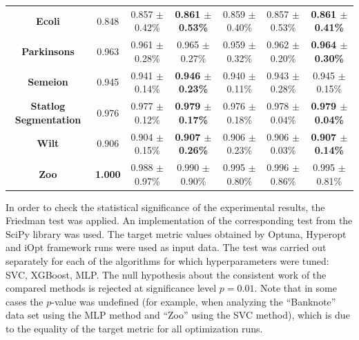 \documentclass[iicol]{sn-jnl}
\theoremstyle{thmstyleone}%
\theoremstyle{thmstyletwo}%
\theoremstyle{thmstylethree}%
\begin{document}
\begin{table}
{\begin{tabular}{ccccccc}
\textbf{Ecoli}                  & 0.848                                 & 0.857 $\pm$ 0.42\%                                 & \textbf{0.861 $\pm$ 0.53\%}                        & 0.859 $\pm$ 0.40\%                                 & 0.857 $\pm$ 0.53\%                                 & {\color[HTML]{FE0000} \textbf{0.861 $\pm$ 0.41\%}} \\
\textbf{Parkinsons}             & {\color[HTML]{FE0000} 0.963}          & 0.961 $\pm$ 0.28\%                                 & 0.965 $\pm$ 0.27\%                                 & 0.959 $\pm$ 0.32\%                                 & 0.962 $\pm$ 0.20\%                                 & \textbf{0.964 $\pm$ 0.30\%}                        \\
\textbf{Semeion}                & {\color[HTML]{FE0000} 0.945}          & 0.941 $\pm$ 0.14\%                                 & \textbf{0.946 $\pm$ 0.23\%}                        & 0.940 $\pm$ 0.11\%                                 & 0.943 $\pm$ 0.28\%                                 & 0.945 $\pm$ 0.15\%                                 \\
\textbf{Statlog   Segmentation} & 0.976                                 & 0.977 $\pm$ 0.12\%                                 & \textbf{0.979 $\pm$ 0.17\%}                        & 0.976 $\pm$ 0.18\%                                 & 0.978 $\pm$ 0.04\%                                 & {\color[HTML]{FE0000} \textbf{0.979 $\pm$ 0.04\%}} \\
\textbf{Wilt}                   & {\color[HTML]{FE0000} 0.906}          & 0.904 $\pm$ 0.15\%                                 & \textbf{0.907 $\pm$ 0.26\%}                        & 0.906 $\pm$ 0.23\%                                 & 0.906 $\pm$ 0.03\%                                 & \textbf{0.907 $\pm$ 0.14\%}                        \\
\textbf{Zoo}                    & {\color[HTML]{FE0000} \textbf{1.000}} & 0.988 $\pm$ 0.97\%                                 & 0.990 $\pm$ 0.90\%                                 & 0.995 $\pm$ 0.80\%                                 & 0.996 $\pm$ 0.86\%                                 & 0.995 $\pm$ 0.81\%                                 \\ \hline
\end{tabular}%
}
\end{table}

In order to check the statistical significance of the experimental results, the Friedman test was applied. An implementation of the corresponding test from the SciPy library was used. The target metric values obtained by Optuna, Hyperopt and iOpt framework runs were used as input data. The test was carried out separately for each of the algorithms for which hyperparameters were tuned: SVC, XGBoost, MLP. The null hypothesis about the consistent work of the compared methods is rejected at significance level $p=0.01$. Note that in some cases the $p$-value was undefined (for example, when analyzing the ``Banknote'' data set using the MLP method and ``Zoo'' using the SVC method), which is due to the equality of the target metric for all optimization runs.
\end{document}
